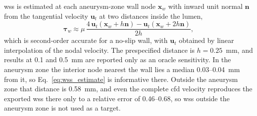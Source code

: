 \documentclass[12pt,a4paper]{article}
\newcommand{\CFD}{\ac{cfd}\xspace}
\newcommand{\WSS}{\ac{wss}\xspace}
\newcommand{\WSScap}{\Ac{wss}\xspace}
\theoremstyle{definition}
\numberwithin{equation}{section}
\begin{document}
\WSScap is estimated at each aneurysm-zone wall node $\mathbf x_w$ with inward unit normal $\mathbf n$ from the tangential velocity $\mathbf u_t$ at two distances inside the lumen,
\begin{equation}
\boldsymbol\tau_w\approx\mu\,\frac{4\,\mathbf u_t(\mathbf x_w+h\mathbf n)-\mathbf u_t(\mathbf x_w+2h\mathbf n)}{2h},
\label{eq:wss_estimate}
\end{equation}
which is second-order accurate for a no-slip wall, with $\mathbf u_t$ obtained by linear interpolation of the nodal velocity. The prespecified distance is $h=0.25$~mm, and results at 0.1 and 0.5~mm are reported only as an oracle sensitivity. In the aneurysm zone the interior node nearest the wall lies a median 0.03--0.04~mm from it, so Eq.~\eqref{eq:wss_estimate} is informative there. Outside the aneurysm zone that distance is 0.58~mm, and even the complete \CFD velocity reproduces the exported \WSS there only to a relative error of 0.46--0.68, so \WSS outside the aneurysm zone is not used as a target.
\end{document}
